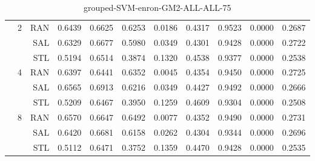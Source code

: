 \begin{center}
\begin{table}[htbp]
\begin{center}
\begin{tabular}{ | r | r | r | r | r | r | r | r | r | r | r |}
 & \multirow{3}{*}{2} & RAN & 0.6439 & 0.6625 & 0.6253 & 0.0186 & 0.4317 & 0.9523 & 0.0000 & 0.2687\\ \cline{3-11}
 &   & SAL & 0.6329 & 0.6677 & 0.5980 & 0.0349 & 0.4301 & 0.9428 & 0.0000 & 0.2722\\ \cline{3-11}
 &   & STL & 0.5194 & 0.6514 & 0.3874 & 0.1320 & 0.4538 & 0.9377 & 0.0000 & 0.2538\\ \cline{2-11}
 & \multirow{3}{*}{4} & RAN & 0.6397 & 0.6441 & 0.6352 & 0.0045 & 0.4354 & 0.9450 & 0.0000 & 0.2725\\ \cline{3-11}
 &   & SAL & 0.6565 & 0.6913 & 0.6216 & 0.0349 & 0.4427 & 0.9492 & 0.0000 & 0.2666\\ \cline{3-11}
 &   & STL & 0.5209 & 0.6467 & 0.3950 & 0.1259 & 0.4609 & 0.9304 & 0.0000 & 0.2508\\ \cline{2-11}
 & \multirow{3}{*}{8} & RAN & 0.6570 & 0.6647 & 0.6492 & 0.0077 & 0.4352 & 0.9490 & 0.0000 & 0.2731\\ \cline{3-11}
 &   & SAL & 0.6420 & 0.6681 & 0.6158 & 0.0262 & 0.4304 & 0.9344 & 0.0000 & 0.2696\\ \cline{3-11}
 &   & STL & 0.5112 & 0.6471 & 0.3752 & 0.1359 & 0.4470 & 0.9428 & 0.0000 & 0.2535\\ \cline{2-11}
\hline
\end{tabular}
\caption{grouped-SVM-enron-GM2-ALL-ALL-75}
\end{center}
 \end{table}
\end{center}

